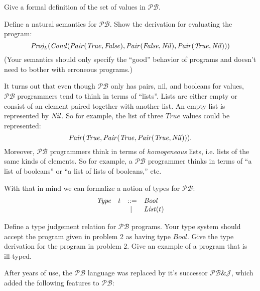 \documentclass[11pt]{article}
\newcommand\Bool{\mathit{Bool}}
\newcommand\True{\mathit{True}}
\newcommand\False{\mathit{False}}
\newcommand\Plang{\mathcal{PB}}
\newcommand\PPlang{\mathcal{PB\&J}}
\begin{document}
\newpage
\begin{exercise}
Give a formal definition of the set of values in $\Plang$.
\end{exercise}
\vspace{1.2in}

\begin{exercise}
Define a natural semantics for $\Plang$. Show the derivation for
evaluating the program:
\[
\ProjL(\Cond(\Cons(\True,\False),\Cons(\False,\Nil),\Cons(\True,\Nil)))
\]
%
(Your semantics should only specify the ``good'' behavior of programs
and doesn't need to bother with erroneous programs.)
\end{exercise}

\newpage
It turns out that even though $\Plang$ only has pairs, nil, and
booleans for values, $\Plang$ programmers tend to think in terms of
``lists''.  Lists are either empty or consist of an element paired
together with another list.  An empty list is represented by $\mathit{Nil}$.  So
for example, the list of three $\True$ values could be represented:
\[
\Cons(\True,\Cons(\True,\Cons(\True,\Nil)))\text.
\]
%
Moreover, $\Plang$ programmers think in terms of \emph{homogeneous}
lists, i.e. lists of the same kinds of elements.  So for example, a
$\Plang$ programmer thinks in terms of ``a list of booleans'' or ``a
list of lists of booleans,'' etc.

With that in mind we can formalize a notion of types for $\Plang$:
\[
\begin{array}{lrcll}
 \mathit{Type} 
               & t & ::= & \Bool\\
               &   &  |\ & \List(t)
\end{array}
\]

\vspace{.5in}

\begin{exercise}
Define a type judgement relation for $\Plang$ programs.  Your type
system should accept the program given in problem 2 as having type
$\Bool$.  Give the type derivation for the program in problem 2.  Give
an example of a program that is ill-typed.
\end{exercise}


\newpage
After years of use, the $\Plang$ language was replaced by it's
successor $\PPlang$, which added the following features to $\Plang$:
\end{document}
